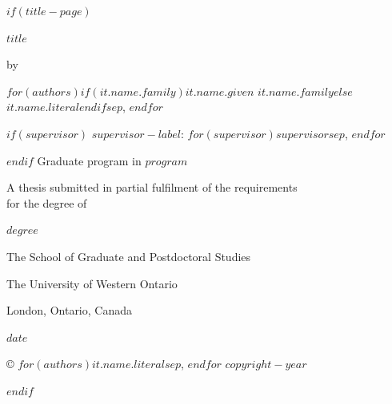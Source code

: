 \westernfrontmatter
$if(title-page)$
\begin{center}
\thispagestyle{empty}
\setlength{\parskip}{0pt}
{\bfseries\MakeUppercase{$title$}\par}
\vfill
by\par
\vfill
$for(authors)$$if(it.name.family)$$it.name.given$ \underline{$it.name.family$}$else$$it.name.literal$$endif$$sep$, $endfor$\par
\vfill
$if(supervisor)$
$supervisor-label$: $for(supervisor)$$supervisor$$sep$, $endfor$\par
\vfill
$endif$
Graduate program in $program$\par
\vfill
A thesis submitted in partial fulfilment of the requirements\\
for the degree of\par
$degree$\par
\vfill
The School of Graduate and Postdoctoral Studies\par
The University of Western Ontario\par
London, Ontario, Canada\par
$date$\par
\vfill
\copyright{} $for(authors)$$it.name.literal$$sep$, $endfor$ $copyright-year$\par
\end{center}
\clearpage
$endif$
